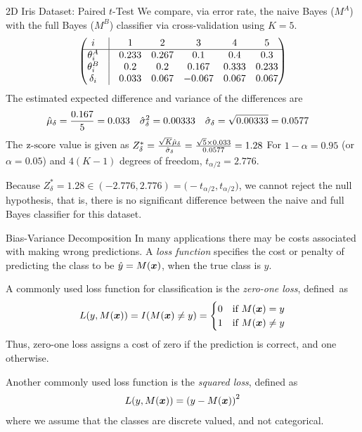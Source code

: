 \begin{frame}[fragile]{2D Iris Dataset: Paired $t$-Test}
  We compare, via error rate,
  the naive Bayes ($M^A$) with the full Bayes ($M^B$) classif\/{i}er via
  cross-validation using $K=5$. 
  \begin{align*}
    \matr{
     i  & \vline & 1 & 2 & 3 & 4 & 5\\
     \hline
    \theta_i^A & \vline & 0.233 & 0.267 & 0.1 & 0.4 & 0.3\\
    \theta_i^B & \vline & 0.2 & 0.2 & 0.167 & 0.333 & 0.233\\
    \delta_i & \vline & 0.033 & 0.067 & -0.067 & 0.067 & 0.067\\
    }
  \end{align*}
The estimated expected difference and variance of the differences are
  \begin{align*}
    \hat{\mu}_\delta & = {0.167 \over 5} = 0.033 &
    \hat{\sigma}^2_\delta & = 0.00333 &
    \hat{\sigma}_\delta & = \sqrt{0.00333} = 0.0577
  \end{align*}
  The $\operatorname{z\text{-}score}$ value is given as
  $ Z^*_\delta = {\sqrt{K} \hat{\mu}_\delta \over \hat{\sigma}_\delta} =
    {\sqrt{5} \times 0.033 \over 0.0577 } = 1.28 $
  For $1-\alpha=0.95$ (or
  $\alpha=0.05$) and
	$4 (K-1)$ degrees of freedom, 
  $t_{\alpha/2} = 2.776$.

\medskip

  Because $Z^*_\delta = 1.28 \in (-2.776, 2.776) =
  \bigl(-t_{\alpha/2}, t_{\alpha/2}\bigr)$, we cannot reject the null
  hypothesis, that  is,
there is no signif\/{i}cant difference
  between the naive and full Bayes classif\/{i}er for this dataset.

\end{frame}


\begin{frame}{Bias-Variance Decomposition}
In many applications there may be costs associated with
making wrong predictions. A {\em loss function}
specif\/{i}es the cost or
penalty of predicting the class to be $\hat{y}=M({\boldsymbol x})$,
when the true class is $y$.

\medskip
A commonly used loss function for classif\/{i}cation is the {\em zero-one
loss}, def\/{i}ned~as
\begin{align*}
  L(y, M({\boldsymbol x})) = I(M({\boldsymbol x}) \ne y) =
  \begin{cases}
    0 & \text{if } M({\boldsymbol x})=y\\
  1 & \text{if } M({\boldsymbol x}) \ne y
 \end{cases}
\end{align*}
Thus, zero-one loss assigns a cost of zero if the prediction is correct, and one otherwise.

\medskip
Another commonly used loss function is the {\em squared loss},
def\/{i}ned
as
\begin{align*}
  L(y, M({\boldsymbol x})) = \left( y - M({\boldsymbol x}) \right)^2
\end{align*}
where we assume that the classes are discrete valued, and not
categorical.
\end{frame}



